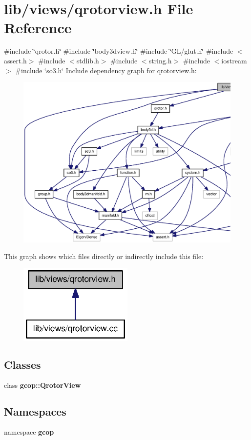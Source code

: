 \section{lib/views/qrotorview.h \-File \-Reference}
\label{qrotorview_8h}
{\ttfamily \#include \char`\"{}qrotor.\-h\char`\"{}}\*
{\ttfamily \#include \char`\"{}body3dview.\-h\char`\"{}}\*
{\ttfamily \#include \char`\"{}\-G\-L/glut.\-h\char`\"{}}\*
{\ttfamily \#include $<$assert.\-h$>$}\*
{\ttfamily \#include $<$stdlib.\-h$>$}\*
{\ttfamily \#include $<$string.\-h$>$}\*
{\ttfamily \#include $<$iostream$>$}\*
{\ttfamily \#include \char`\"{}so3.\-h\char`\"{}}\*
\-Include dependency graph for qrotorview.\-h\-:\nopagebreak
\begin{figure}[H]
\begin{center}
\leavevmode
\includegraphics[width=350pt]{qrotorview_8h__incl}
\end{center}
\end{figure}
\-This graph shows which files directly or indirectly include this file\-:\nopagebreak
\begin{figure}[H]
\begin{center}
\leavevmode
\includegraphics[width=160pt]{qrotorview_8h__dep__incl}
\end{center}
\end{figure}
\subsection*{\-Classes}
\begin{DoxyCompactItemize}
\item 
class {\bf gcop\-::\-Qrotor\-View}
\end{DoxyCompactItemize}
\subsection*{\-Namespaces}
\begin{DoxyCompactItemize}
\item 
namespace {\bf gcop}
\end{DoxyCompactItemize}
